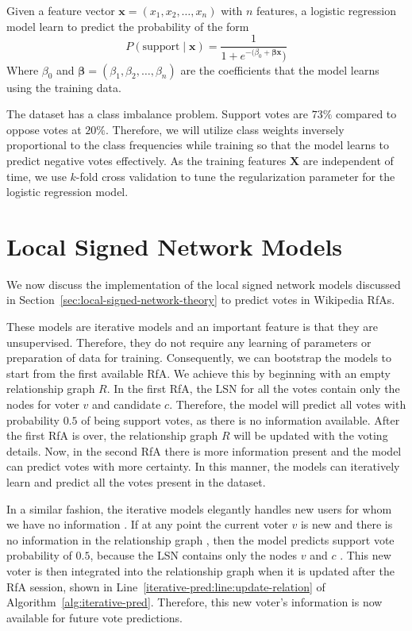 Given a feature vector $\mathbf{x}=(x_{1},x_{2},\dots,x_{n})$ with $n$ features, a logistic regression model learn to predict the probability of the form 
\begin{equation}
    P(\text{support} \mid \mathbf{x}) = \frac{1}{1+e^{-(\beta_{0} + \boldsymbol{\beta}\mathbf{x}})}
\end{equation}
Where $\beta_{0}$ and $\boldsymbol{\beta} = (\beta_{1},\beta_{2},\dots,\beta_{n})$ are the coefficients that the model learns using the training data.

The \wikirfa dataset has a class imbalance problem.
Support votes are $73\%$ compared to oppose votes at $20\%$.
Therefore, we will utilize class weights inversely proportional to the class frequencies while training so that the model learns to predict negative votes effectively. 
As the training features $\mathbf{X}$ are independent of time, we use $k$-fold cross validation to tune the regularization parameter for the logistic regression model.  

\section{Local Signed Network Models}
\label{sec:local-signed-network-implementation}
We now discuss the implementation of the local signed network models discussed in Section~\ref{sec:local-signed-network-theory} to predict votes in Wikipedia RfAs.

These models are iterative models and an important feature is that they are unsupervised.
Therefore, they do not require any learning of parameters or preparation of data for training.
Consequently, we can bootstrap the models to start from the first available RfA.
We achieve this by beginning with an empty relationship graph $R$.
In the first RfA, the LSN for all the votes contain only the nodes for voter $v$ and candidate $c$.
Therefore, the model will predict all votes with probability $0.5$ of being support votes, as there is no information available.
After the first RfA is over, the relationship graph $R$ will be updated with the voting details.
Now, in the second RfA there is more information present and the model can predict votes with more certainty.
In this manner, the models can iteratively learn and predict all the votes present in the \wikirfa dataset.

In a similar fashion, the iterative models elegantly handles new users for whom we have no information .
If at any point the current voter $v$ is new and there is no information in the relationship graph , then the model predicts support vote probability of $0.5$, because the LSN contains only the nodes $v$ and $c$ .
This new voter is then integrated into the relationship graph when it is updated after the RfA session, shown in Line~\ref{iterative-pred:line:update-relation} of Algorithm~\ref{alg:iterative-pred}.
Therefore, this new voter's information is now available for future vote predictions.

